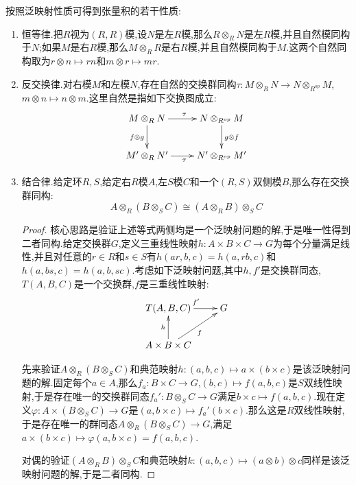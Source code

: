 按照泛映射性质可得到张量积的若干性质:
\begin{enumerate}
	\item 恒等律.把$R$视为$(R,R)$模,设$N$是左$R$模,那么$R\otimes_RN$是左$R$模,并且自然模同构于$N$;如果$M$是右$R$模,那么$M\otimes_RR$是右$R$模,并且自然模同构于$M$.这两个自然同构取为$r\otimes n\mapsto rn$和$m\otimes r\mapsto mr$.
	\item 反交换律.对右模$M$和左模$N$,存在自然的交换群同构$\tau:M\otimes_RN\to N\otimes_{R^{op}}M$,$m\otimes n\mapsto n\otimes m$.这里自然是指如下交换图成立:
	$$\xymatrix{
		M\otimes_RN\ar[r]^{\tau}\ar[d]_{f\otimes g}&N\otimes_{R^{op}}M\ar[d]^{g\otimes f}\\
		M'\otimes_RN'\ar[r]_{\tau}&N'\otimes_{R^{op}}M'
	}$$
	\item 结合律.给定环$R,S$,给定右$R$模$A$,左$S$模$C$和一个$(R,S)$双侧模$B$,那么存在交换群同构:
	$$A\otimes_R(B\otimes_SC)\cong(A\otimes_RB)\otimes_SC$$
	\begin{proof}
		
		核心思路是验证上述等式两侧均是一个泛映射问题的解,于是唯一性得到二者同构.给定交换群$G$,定义三重线性映射$h:A\times B\times C\to G$为每个分量满足线性,并且对任意的$r\in R$和$s\in S$有$h(ar,b,c)=h(a,rb,c)$和$h(a,bs,c)=h(a,b,sc)$.考虑如下泛映射问题,其中$h,f'$是交换群同态,$T(A,B,C)$是一个交换群,$f$是三重线性映射:
		$$\xymatrix{T(A,B,C)\ar[r]^{f'}&G\\
		A\times B\times C\ar[u]^h\ar[ur]_f&}$$
	
	    先来验证$A\otimes_R(B\otimes_SC)$和典范映射$h:(a,b,c)\mapsto a\times(b\times c)$是该泛映射问题的解.固定每个$a\in A$,那么$f_a:B\times C\to G$,$(b,c)\mapsto f(a,b,c)$是$S$双线性映射,于是存在唯一的交换群同态$f_a':B\otimes_SC\to G$满足$b\times c\mapsto f(a,b,c)$.现在定义$\varphi:A\times(B\otimes_SC)\to G$是$(a,b\times c)\mapsto f_a'(b\times c)$.那么这是$R$双线性映射,于是存在唯一的群同态$A\otimes_R(B\otimes_SC)\to G$,满足$a\times(b\times c)\mapsto \varphi(a,b\times c)=f(a,b,c)$.
	
	    对偶的验证$(A\otimes_RB)\otimes_SC$和典范映射$k:(a,b,c)\mapsto(a\otimes b)\otimes c$同样是该泛映射问题的解,于是二者同构.
	\end{proof}
\end{enumerate}


